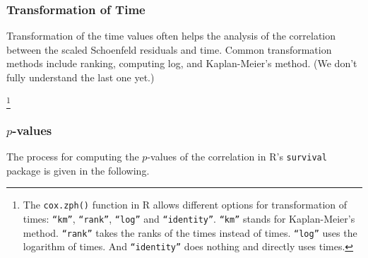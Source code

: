 \subsubsection{Transformation of Time}\label{cox:transform}
Transformation of the time values often helps the analysis of the correlation
between the scaled Schoenfeld residuals and time. Common transformation methods
include ranking, computing log, and Kaplan-Meier's method. (We don't fully
understand the last one yet.)

\footnote{The \texttt{cox.zph()} function in R allows different options for
transformation of times: \texttt{``km''}, \texttt{``rank''},
\texttt{``log''} and \texttt{``identity''}.
\texttt{``km''} stands for Kaplan-Meier's method.
\texttt{``rank''} takes the ranks of the times instead of times.
\texttt{``log''} uses the logarithm of times.
And \texttt{``identity''} does nothing and directly uses times.\cite{cox-zph}}


\subsubsection{$p$-values}
The process for computing the $p$-values of the correlation in R's
\texttt{survival} package is given
in the following.

